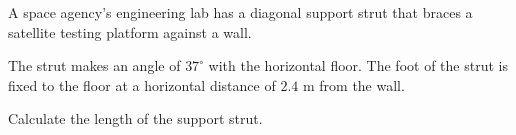\begin{question}
\noindent A space agency's engineering lab has a diagonal support strut that braces a satellite testing platform against a wall.

\noindent The strut makes an angle of $37^\circ$ with the horizontal floor. The foot of the strut is fixed to the floor at a horizontal distance of $2.4$ m from the wall.

\noindent Calculate the length of the support strut.

\vspace{4cm}

\begin{flushright}
\end{flushright}
\end{question}
